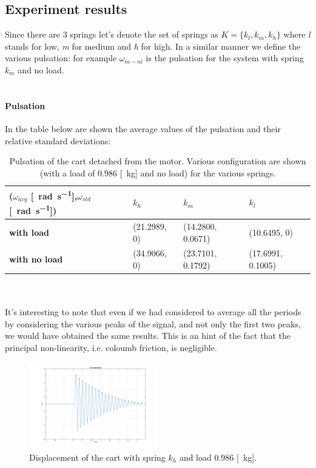 \subsection{Experiment results}
Since there are $3$ springs let's denote the set of springs as $K=\{k_l, k_m, k_h\}$ where \emph{l} stands for low, \emph{m} for medium and \emph{h} for high. In a similar manner we define the various pulsation: for example $\omega_{m-nl}$ is the pulsation for the system with spring $k_m$ and no load.
\\ \\ 
\paragraph{Pulsation}
In the table below are shown the average values of the pulsation and their relative standard deviations:
\begin{table}[!h]
\centering


\begin{tabular}{|l|l|l|l|}
\hline
{(\textbf{$\omega_{avg}$} [\SI{}{\radian \per \second}],$\omega_{std}$ [\SI{}{\radian \per \second}])} & \textbf{$k_h$} & \textbf{$k_m$}   & \textbf{$k_l$}   \\ \hline
\textbf{with load}         & (21.2989, 0)    & (14.2800, 0.0671) & (10.6495, 0)      \\ \hline
\textbf{with no load}      & (34.9066, 0)    & (23.7101, 0.1792) & (17.6991, 0.1005) \\ \hline
\end{tabular}

\caption{Pulsation of the cart detached from the motor. Various configuration are shown (with a load of $0.986$ [\SI{}{\kilo \gram}] and no load) for the various springs. }
\label{table:cart_detached_omega}
\end{table} \\ \\
It's interesting to note that even if we  had considered to average all the periods by considering the various peaks of the signal, and not only the first two peaks, we would have obtained the same results. This is an hint of the fact that the principal non-linearity, i.e. coloumb friction, is negligible.

\begin{figure}[!ht]
    \centering
    \includegraphics[width=0.5\textwidth]{img/cart_detached_1.png}
    \caption{Displacement of the cart with spring $k_h$ and load $0.986$ [\SI{}{\kilo \gram}].}
    \label{fig:cart_detached_figure}
\end{figure}

